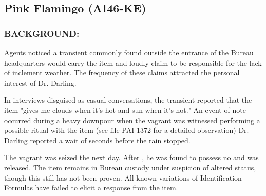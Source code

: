 \subsection*{Pink Flamingo (AI46-KE)}
\subsubsection*{BACKGROUND:}
\par Agents noticed a transient commonly found outside the entrance
of the Bureau headquarters would carry the item and loudly claim
to be responsible for the lack of inclement weather. The
frequency of these claims attracted the personal interest of Dr.
Darling.
\par In interviews disguised as casual conversations, the transient
reported that the item "gives me clouds when it's hot and sun
when it's not." An event of note occurred during a heavy
downpour when the vagrant was witnessed performing a possible
ritual with the item (see file PAI-1372 for a detailed observation)
Dr. Darling reported a wait of 
seconds before the rain
stopped.
\par The vagrant was seized the next day. After , he
was found to possess no  and was released. The
item remains in Bureau custody under suspicion of altered status,
though this still has not been proven. All known variations of
Identification Formulas have failed to elicit a response from the
item.